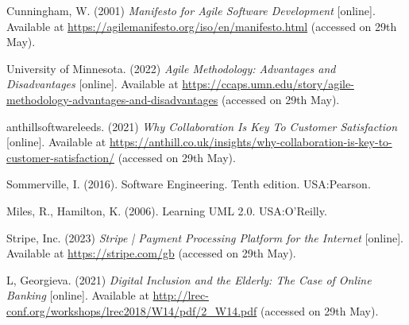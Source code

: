 \noindent [10] Cunningham, W. (2001) \textit{Manifesto for Agile Software Development} [online]. Available at \url{https://agilemanifesto.org/iso/en/manifesto.html} (accessed on 29th May).
\vspace{0.2cm}

\noindent [11] University of Minnesota. (2022) \textit{Agile Methodology: Advantages and Disadvantages} [online]. Available at \url{https://ccaps.umn.edu/story/agile-methodology-advantages-and-disadvantages} (accessed on 29th May).
\vspace{0.2cm}

\noindent [12] anthillsoftwareleeds. (2021) \textit{Why Collaboration Is Key To Customer Satisfaction} [online]. Available at \url{https://anthill.co.uk/insights/why-collaboration-is-key-to-customer-satisfaction/} (accessed on 29th May).
\vspace{0.2cm}

\noindent [13] Sommerville, I. (2016). Software Engineering. Tenth edition. USA:Pearson.
\vspace{0.2cm}

\noindent [14] Miles, R., Hamilton, K. (2006). Learning UML 2.0. USA:O'Reilly.
\vspace{0.2cm}

\noindent [15] Stripe, Inc. (2023) \textit{Stripe | Payment Processing Platform for the Internet} [online]. Available at \url{https://stripe.com/gb} (accessed on 29th May).
\vspace{0.2cm}

\noindent [16] L, Georgieva. (2021) \textit{Digital Inclusion and the Elderly: The Case of Online Banking} [online]. Available at \url{http://lrec-conf.org/workshops/lrec2018/W14/pdf/2_W14.pdf} (accessed on 29th May).
\vspace{0.2cm}

\newpage
